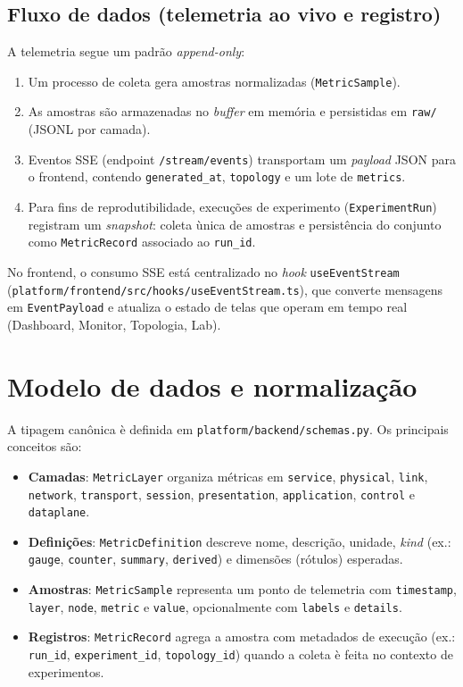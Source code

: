 \documentclass[12pt,oneside]{report}
\begin{document}
\subsection{Fluxo de dados (telemetria ao vivo e registro)}
A telemetria segue um padr\~ao \textit{append-only}:

\begin{enumerate}
\item Um processo de coleta gera amostras normalizadas (\texttt{MetricSample}).
\item As amostras s\~ao armazenadas no \textit{buffer} em mem\'oria e persistidas em \texttt{raw/} (JSONL por camada).
\item Eventos SSE (endpoint \texttt{/stream/events}) transportam um \textit{payload} JSON para o frontend, contendo \texttt{generated\_at}, \texttt{topology} e um lote de \texttt{metrics}.
\item Para fins de reprodutibilidade, execu\c{c}\~oes de experimento (\texttt{ExperimentRun}) registram um \textit{snapshot}: coleta \`unica de amostras e persist\^encia do conjunto como \texttt{MetricRecord} associado ao \texttt{run\_id}.
\end{enumerate}

No frontend, o consumo SSE est\'a centralizado no \textit{hook} \texttt{useEventStream} (\texttt{platform/frontend/src/hooks/useEventStream.ts}), que converte mensagens em \texttt{EventPayload} e atualiza o estado de telas que operam em tempo real (Dashboard, Monitor, Topologia, Lab).

\section{Modelo de dados e normaliza\c{c}\~ao}
A tipagem can\^onica \`e definida em \texttt{platform/backend/schemas.py}. Os principais conceitos s\~ao:

\begin{itemize}
\item \textbf{Camadas}: \texttt{MetricLayer} organiza m\'etricas em \texttt{service}, \texttt{physical}, \texttt{link}, \texttt{network}, \texttt{transport}, \texttt{session}, \texttt{presentation}, \texttt{application}, \texttt{control} e \texttt{dataplane}.
\item \textbf{Defini\c{c}\~oes}: \texttt{MetricDefinition} descreve nome, descri\c{c}\~ao, unidade, \textit{kind} (ex.: \texttt{gauge}, \texttt{counter}, \texttt{summary}, \texttt{derived}) e dimens\~oes (r\'otulos) esperadas.
\item \textbf{Amostras}: \texttt{MetricSample} representa um ponto de telemetria com \texttt{timestamp}, \texttt{layer}, \texttt{node}, \texttt{metric} e \texttt{value}, opcionalmente com \texttt{labels} e \texttt{details}.
\item \textbf{Registros}: \texttt{MetricRecord} agrega a amostra com metadados de execu\c{c}\~ao (ex.: \texttt{run\_id}, \texttt{experiment\_id}, \texttt{topology\_id}) quando a coleta \`e feita no contexto de experimentos.
\end{itemize}
\end{document}
